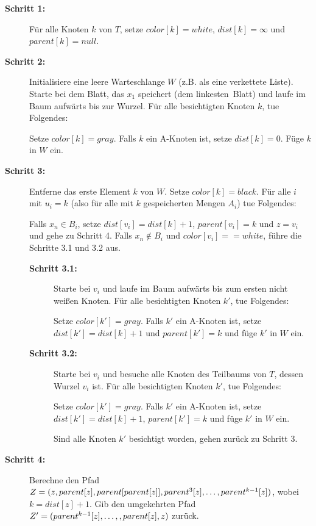     \begin{description}
    	\item[\textbf{Schritt 1:}] Für alle Knoten $k$ von $T$, setze $color[k] = white$, $dist[k] = \infty$ und $parent[k] = null$.
    	
    	\item[\textbf{Schritt 2:}] Initialisiere eine leere Warteschlange $W$ (z.B. als eine verkettete Liste).
    	Starte bei dem Blatt, das $x_1$ speichert (dem \glqq linkesten\grqq\ Blatt) und laufe im Baum aufwärts bis zur Wurzel. 
    	Für alle besichtigten Knoten $k$, tue Folgendes: 
    	
		    Setze $color[k] = gray$.
    		Falls $k$ ein A-Knoten ist, setze $dist[k] = 0$.
    		Füge $k$ in $W$ ein.
    		
    	\item[\textbf{Schritt 3:}] Entferne das erste Element $k$ von $W$. Setze $color[k] = black$.
    	Für alle $i$ mit $u_i = k$ (also für alle mit $k$ gespeicherten Mengen $A_i$) tue Folgendes:
    	
    	Falls $x_n \in B_i$, setze $dist[v_i] = dist[k] + 1$, $parent[v_i] = k$ und $z = v_i$ und gehe zu Schritt 4.\n
    	Falls $x_n \notin B_i$ und $color[v_i] == white$, führe die Schritte 3.1 und 3.2 aus.
    	\begin{description}
    		\item[\textbf{Schritt 3.1:}] Starte bei $v_i$ und laufe im Baum aufwärts bis zum ersten nicht weißen Knoten. Für alle besichtigten Knoten $k'$, tue Folgendes:
    		
    		Setze $color[k'] = gray$. Falls $k'$ ein A-Knoten ist, setze $dist[k'] = dist[k]+1$ und $parent[k'] = k$ und füge $k'$ in $W$ ein.
    		
    		\item[\textbf{Schritt 3.2:}] Starte bei $v_i$ und besuche alle Knoten des Teilbaums von $T$, dessen Wurzel $v_i$ ist. Für alle besichtigten Knoten $k'$, tue Folgendes:
    		
    		Setze $color[k'] = gray$. Falls $k'$ ein A-Knoten ist, setze $dist[k'] = dist[k] + 1$, $parent[k']	= k$ und füge $k'$ in $W$ ein.
    		
    		Sind alle Knoten $k'$ besichtigt worden, gehen zurück zu Schritt 3.
    	\end{description}
    	
    	\item[\textbf{Schritt 4:}] Berechne den Pfad $Z = (z, parent[z], parent[parent[z]], parent^3[z],  \mathellipsis, parent^{k-1}[z])$, wobei $k = dist[z] + 1$. Gib den umgekehrten Pfad $Z' = (parent^{k-1}[z], \mathellipsis,, parent[z], z)$ zurück.
    \end{description}
    
